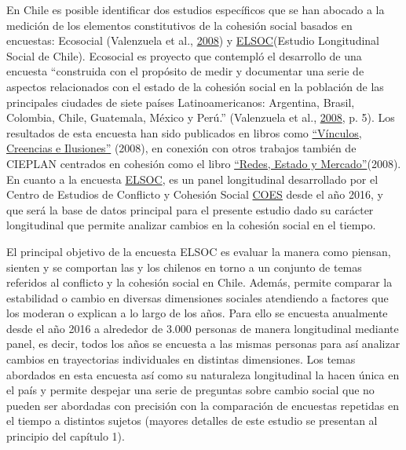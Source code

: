 \documentclass[
  12pt,
]{book}
\begin{document}
En Chile es posible identificar dos estudios específicos que se han abocado a la medición de los elementos constitutivos de la cohesión social basados en encuestas: Ecosocial (Valenzuela et al., \protect\hyperlink{ref-valenzuela_vinculos_2008}{2008}) y \href{https://coes.cl/encuesta-panel/}{ELSOC}(Estudio Longitudinal Social de Chile). Ecosocial es proyecto que contempló el desarrollo de una encuesta ``construida con el propósito de medir y documentar una serie de aspectos relacionados con el estado de la cohesión social en la población de las principales ciudades de siete países Latinoamericanos: Argentina, Brasil, Colombia, Chile, Guatemala, México y Perú.'' (Valenzuela et al., \protect\hyperlink{ref-valenzuela_vinculos_2008}{2008}, p. 5). Los resultados de esta encuesta han sido publicados en libros como \href{https://www.cieplan.org/wp-content/uploads/2019/12/Libro_Completo_Vinculos_Creencia_e_Ilusiones.pdf}{``Vínculos, Creencias e Ilusiones''} (2008), en conexión con otros trabajos también de CIEPLAN centrados en cohesión como el libro \href{https://www.cieplan.org/wp-content/uploads/2019/12/Libro_Completo_Redes_Estado_y_Mercado_compressed.pdf}{``Redes, Estado y Mercado''}(2008). En cuanto a la encuesta \href{https://coes.cl/encuesta-panel/}{ELSOC}, es un panel longitudinal desarrollado por el Centro de Estudios de Conflicto y Cohesión Social \href{https://www.coes.cl/}{COES} desde el año 2016, y que será la base de datos principal para el presente estudio dado su carácter longitudinal que permite analizar cambios en la cohesión social en el tiempo.

El principal objetivo de la encuesta ELSOC es evaluar la manera como piensan, sienten y se comportan las y los chilenos en torno a un conjunto de temas referidos al conflicto y la cohesión social en Chile. Además, permite comparar la estabilidad o cambio en diversas dimensiones sociales atendiendo a factores que los moderan o explican a lo largo de los años. Para ello se encuesta anualmente desde el año 2016 a alrededor de 3.000 personas de manera longitudinal mediante panel, es decir, todos los años se encuesta a las mismas personas para así analizar cambios en trayectorias individuales en distintas dimensiones. Los temas abordados en esta encuesta así como su naturaleza longitudinal la hacen única en el país y permite despejar una serie de preguntas sobre cambio social que no pueden ser abordadas con precisión con la comparación de encuestas repetidas en el tiempo a distintos sujetos (mayores detalles de este estudio se presentan al principio del capítulo 1).
\end{document}
